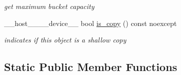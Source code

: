 \begin{DoxyCompactItemize}
\begin{DoxyCompactList}\small\item\em get maximum bucket capacity \end{DoxyCompactList}\item 
\+\_\+\+\_\+host\+\_\+\+\_\+\+\_\+\+\_\+device\+\_\+\+\_\+ bool \hyperlink{classwarpcore_1_1storage_1_1multi__value_1_1BucketListStore_aa4ac88f26d621b59508ec65c6f31fbec}{is\+\_\+copy} () const noexcept
\begin{DoxyCompactList}\small\item\em indicates if this object is a shallow copy \end{DoxyCompactList}\end{DoxyCompactItemize}
\subsection*{Static Public Member Functions}
